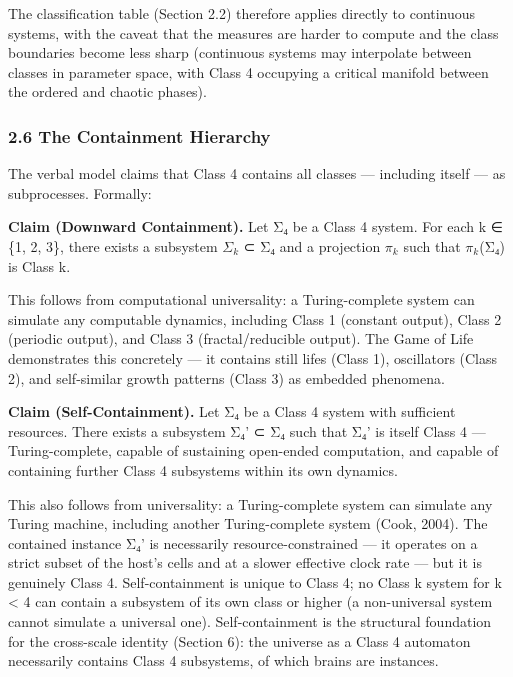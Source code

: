 \documentclass[
]{article}
\begin{document}
The classification table (Section 2.2) therefore applies directly to
continuous systems, with the caveat that the measures are harder to
compute and the class boundaries become less sharp (continuous systems
may interpolate between classes in parameter space, with Class 4
occupying a critical manifold between the ordered and chaotic phases).

\hypertarget{the-containment-hierarchy}{%
\subsubsection{2.6 The Containment
Hierarchy}\label{the-containment-hierarchy}}

The verbal model claims that Class 4 contains all classes --- including
itself --- as subprocesses. Formally:

\textbf{Claim (Downward Containment).} Let Σ₄ be a Class 4 system. For
each k ∈ \{1, 2, 3\}, there exists a subsystem \(\Sigma_{k}\) ⊂ Σ₄ and a
projection \(\pi_{k}\) such that \(\pi_{k}\)(Σ₄) is Class k.

This follows from computational universality: a Turing-complete system
can simulate any computable dynamics, including Class 1 (constant
output), Class 2 (periodic output), and Class 3 (fractal/reducible
output). The Game of Life demonstrates this concretely --- it contains
still lifes (Class 1), oscillators (Class 2), and self-similar growth
patterns (Class 3) as embedded phenomena.

\textbf{Claim (Self-Containment).} Let Σ₄ be a Class 4 system with
sufficient resources. There exists a subsystem Σ₄' ⊂ Σ₄ such that Σ₄' is
itself Class 4 --- Turing-complete, capable of sustaining open-ended
computation, and capable of containing further Class 4 subsystems within
its own dynamics.

This also follows from universality: a Turing-complete system can
simulate any Turing machine, including another Turing-complete system
(Cook, 2004). The contained instance Σ₄' is necessarily
resource-constrained --- it operates on a strict subset of the host's
cells and at a slower effective clock rate --- but it is genuinely Class
4. Self-containment is unique to Class 4; no Class k system for k
\textless{} 4 can contain a subsystem of its own class or higher (a
non-universal system cannot simulate a universal one). Self-containment
is the structural foundation for the cross-scale identity (Section 6):
the universe as a Class 4 automaton necessarily contains Class 4
subsystems, of which brains are instances.
\end{document}
